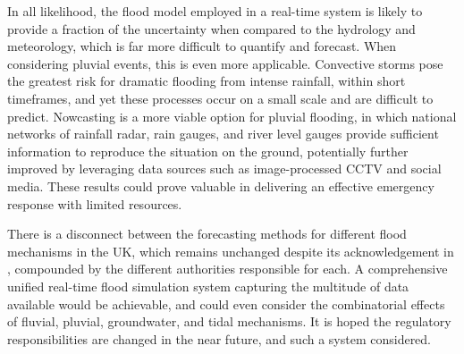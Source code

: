 In all likelihood, the flood model employed in a real-time system is likely to provide a fraction of the uncertainty when compared to the hydrology and meteorology, which is far more difficult to quantify and forecast. When considering pluvial events, this is even more applicable. Convective storms pose the greatest risk for dramatic flooding from intense rainfall, within short timeframes, and yet these processes occur on a small scale and are difficult to predict. Nowcasting is a more viable option for pluvial flooding, in which national networks of rainfall radar, rain gauges, and river level gauges provide sufficient information to reproduce the situation on the ground, potentially further improved by leveraging data sources such as image-processed CCTV and social media. These results could prove valuable in delivering an effective emergency response with limited resources.

There is a disconnect between the forecasting methods for different flood mechanisms in the UK, which remains unchanged despite its acknowledgement in \citet{Pitt2007}, compounded by the different authorities responsible for each. A comprehensive unified real-time flood simulation system capturing the multitude of data available would be achievable, and could even consider the combinatorial effects of fluvial, pluvial, groundwater, and tidal mechanisms. It is hoped the regulatory responsibilities are changed in the near future, and such a system considered.
